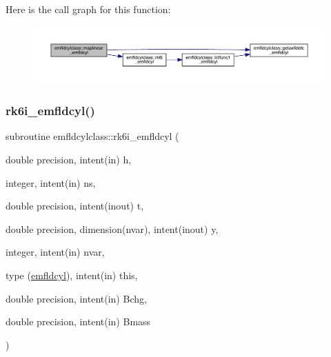 Here is the call graph for this function\+:\nopagebreak
\begin{figure}[H]
\begin{center}
\leavevmode
\includegraphics[width=350pt]{namespaceemfldcylclass_a6ecff12cc9860de4f3ec126083db6fea_cgraph}
\end{center}
\end{figure}
\mbox{\label{namespaceemfldcylclass_a9bd0c565261b617a6860bb5ae288b486}} 
\subsubsection{\texorpdfstring{rk6i\_emfldcyl()}{rk6i\_emfldcyl()}}
{\footnotesize\ttfamily subroutine emfldcylclass\+::rk6i\+\_\+emfldcyl (\begin{DoxyParamCaption}\item[{double precision, intent(in)}]{h,  }\item[{integer, intent(in)}]{ns,  }\item[{double precision, intent(inout)}]{t,  }\item[{double precision, dimension(nvar), intent(inout)}]{y,  }\item[{integer, intent(in)}]{nvar,  }\item[{type (\mbox{\hyperlink{namespaceemfldcylclass_structemfldcylclass_1_1emfldcyl}{emfldcyl}}), intent(in)}]{this,  }\item[{double precision, intent(in)}]{Bchg,  }\item[{double precision, intent(in)}]{Bmass }\end{DoxyParamCaption})}


